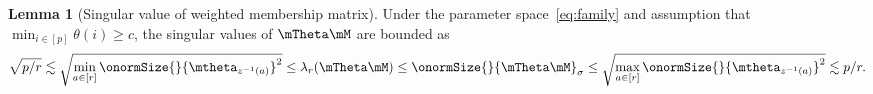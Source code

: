 \documentclass[lettersize,onecolumn,journal]{IEEEtran}
\theoremstyle{definition}
\newtheorem{lem}{Lemma}
\theoremstyle{definition}
\newcommand{\ang}[1]{\left\langle#1\right\rangle}
\begin{document}




\begin{lem}[Singular value of weighted membership matrix]\label{lem:singular_thetam} Under the parameter space~\eqref{eq:family} and assumption that $\min_{i \in [p]} \theta(i) \geq c$, the singular values of $\mTheta \mM$ are bounded as 
\begin{equation}\label{eq:membership2}
     \sqrt{p/r} \lesssim \sqrt{ \min_{a \in [r]}\onormSize{}{ \mtheta_{ z^{-1}(a)} }^2 }  \leq \lambda_{r}(\mTheta \mM) \leq \onormSize{}{\mTheta \mM}_{\sigma} \leq\sqrt{ \max_{a \in [r]}\onormSize{}{ \mtheta_{ z^{-1}(a)} }^2 } \lesssim  p /r .
\end{equation}
\end{lem}
\end{document}
